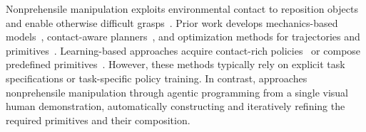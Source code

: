  Nonprehensile manipulation exploits environmental contact to reposition objects and enable otherwise difficult grasps~\cite{chavandafle2014extrinsic}. Prior work develops mechanics-based models~\cite{lynch1996stable,holladay2015general}, contact-aware planners~\cite{lee2015hierarchical,cheng2021contact,cheng2022contact}, and optimization methods for trajectories and primitives~\cite{sleiman2019contact,aceituno2020global,pang2023global,huang2023autogenerated}. Learning-based approaches acquire contact-rich policies~\cite{zhou2023learning,zhou2023hacman,cho2024corn} or compose predefined primitives~\cite{nasiriany2022augmenting}. However, these methods typically rely on explicit task specifications or task-specific policy training. In contrast, \ours approaches nonprehensile manipulation through agentic programming from a single visual human demonstration, automatically constructing and iteratively refining the required primitives and their composition.
